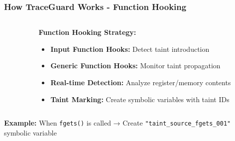 \documentclass[aspectratio=169]{beamer}
\begin{document}
\begin{frame}
    \frametitle{How TraceGuard Works - Function Hooking}
    \vspace{1em}
    \begin{columns}
        \begin{column}{0.5\textwidth}
        \end{column}
        \begin{column}{0.5\textwidth}
            \textbf{Function Hooking Strategy:}
            \begin{itemize}
                \item \textbf{Input Function Hooks:} Detect taint introduction
                \item \textbf{Generic Function Hooks:} Monitor taint propagation
                \item \textbf{Real-time Detection:} Analyze register/memory contents
                \item \textbf{Taint Marking:} Create symbolic variables with taint IDs
            \end{itemize}
        \end{column}
    \end{columns}
    
    \vspace{1em}
    \textbf{Example:} When \texttt{fgets()} is called → Create \texttt{"taint\_source\_fgets\_001"} symbolic variable
\end{frame}
\end{document}
